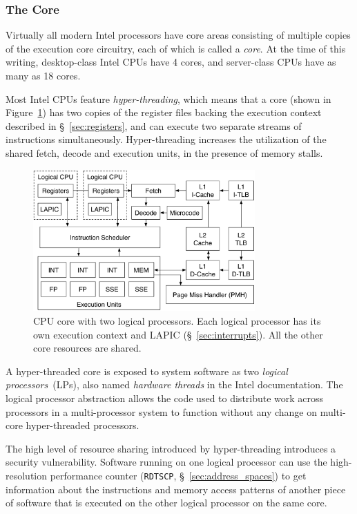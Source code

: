 \subsubsection{The Core}
\label{sec:cpu_core}

Virtually all modern Intel processors have core areas consisting of multiple
copies of the execution core circuitry, each of which is called a
\textit{core}.  At the time of this writing, desktop-class Intel CPUs have 4
cores, and server-class CPUs have as many as 18 cores.

Most Intel CPUs feature \textit{hyper-threading}, which means that a core
(shown in Figure~\ref{fig:cpu_core}) has two copies of the register files
backing the execution context described in \S~\ref{sec:registers}, and can
execute two separate streams of instructions simultaneously. Hyper-threading
increases the utilization of the shared fetch, decode and execution units, in
the presence of memory stalls.

\begin{figure}[hbt]
  \centering
  \includegraphics[width=85mm]{figures/cpu_core.pdf}
  \caption{
    CPU core with two logical processors. Each logical processor has its own
    execution context and LAPIC (\S~\ref{sec:interrupts}). All the other core
    resources are shared.
  }
  \label{fig:cpu_core}
\end{figure}

A hyper-threaded core is exposed to system software as two \textit{logical
processors}~(LPs), also named \textit{hardware threads} in the Intel
documentation. The logical processor abstraction allows the code used to
distribute work across processors in a multi-processor system to function
without any change on multi-core hyper-threaded processors.

The high level of resource sharing introduced by hyper-threading introduces a
security vulnerability. Software running on one logical processor can use the
high-resolution performance counter (\texttt{RDTSCP},
\S~\ref{sec:address_spaces}) \cite{petters1999making} to get information about
the instructions and memory access patterns of another piece of software that
is executed on the other logical processor on the same core.
